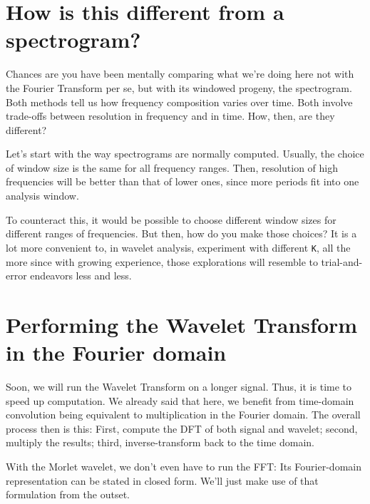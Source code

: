 \documentclass[
  letterpaper,
]{krantz}
\begin{document}
\hypertarget{how-is-this-different-from-a-spectrogram}{%
\section{How is this different from a
spectrogram?}\label{how-is-this-different-from-a-spectrogram}}

Chances are you have been mentally comparing what we're doing here not
with the Fourier Transform per se, but with its windowed progeny, the
spectrogram. Both methods tell us how frequency composition varies over
time. Both involve trade-offs between resolution in frequency and in
time. How, then, are they different?

Let's start with the way spectrograms are normally computed. Usually,
the choice of window size is the same for all frequency ranges. Then,
resolution of high frequencies will be better than that of lower ones,
since more periods fit into one analysis window.

To counteract this, it would be possible to choose different window
sizes for different ranges of frequencies. But then, how do you make
those choices? It is a lot more convenient to, in wavelet analysis,
experiment with different \texttt{K}, all the more since with growing
experience, those explorations will resemble to trial-and-error
endeavors less and less.

\hypertarget{performing-the-wavelet-transform-in-the-fourier-domain}{%
\section{\texorpdfstring{Performing the Wavelet Transform in the Fourier
domain}{Performing the Wavelet Transform in the Fourier domain}}\label{performing-the-wavelet-transform-in-the-fourier-domain}}

Soon, we will run the Wavelet Transform on a longer signal. Thus, it is
time to speed up computation. We already said that here, we benefit from
time-domain convolution being equivalent to multiplication in the
Fourier domain. The overall process then is this: First, compute the DFT
of both signal and wavelet; second, multiply the results; third,
inverse-transform back to the time domain.

With the Morlet wavelet, we don't even have to run the FFT: Its
Fourier-domain representation can be stated in closed form. We'll just
make use of that formulation from the outset.
\end{document}
